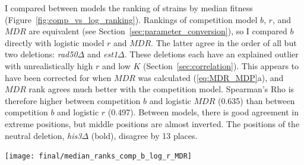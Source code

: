 \begin{multicols}{2}
I compared between models the ranking of strains by median fitness
(Figure~\ref{fig:comp_vs_log_ranking}). Rankings of competition model
\(b\), \(r\), and \(MDR\) are equivalent (see
Section~\ref{sec:parameter_conversion}), so I compared \(b\) directly
with logistic model \(r\) and \(MDR\). The latter agree in the order
of all but two deletions: \textit{rad50\(\Delta\)} and
\textit{est1\(\Delta\)}. These deletions each have an explained
outlier with unrealistically high \(r\) and low \(K\)
(Section~\ref{sec:correlation}). This appears to have been corrected
for when \(MDR\) was calculated (\ref{eq:MDR_MDP}a), and \(MDR\) rank
agrees much better with the competition model. Spearman's Rho is
therefore higher between competition \(b\) and logistic \(MDR\)
(0.635) than between competition \(b\) and logistic \(r\)
(0.497). Between models, there is good agreement in extreme positions,
but middle positions are almost inverted. The positions of the neutral
deletion, \textit{his3\(\Delta\)} (bold), disagree by 13 places.

\graphicspath{{images/rank/}}
\begin{Figure}
  \centering
  \texttt{[image: final/median\_ranks\_comp\_b\_log\_r\_MDR]}
  \label{fig:comp_vs_log_ranking}
\end{Figure}



\end{multicols}
